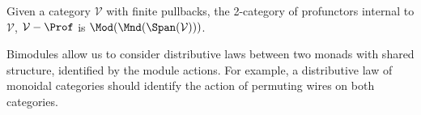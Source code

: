 



\begin{definition}
\label{def:fa}
\end{definition}


\begin{definition}
\label{def:ba}
\end{definition}



\begin{lemma}
\label{lemma:spanpres}
\end{lemma}



\begin{definition}
\label{def:bimod}
\end{definition}



\begin{definition}
\label{def:internalprof}
Given a category $\mathcal V$ with finite pullbacks, the 2-category of profunctors internal to $\mathcal V$, $\mathcal{V}-\Prof$ is $\Mod(\Mnd(\Span(\mathcal{V})))$.
\end{definition}

Bimodules allow us to consider distributive laws between two monads with shared structure, identified by the module actions.  For example, a distributive law of monoidal categories should identify the action of permuting wires on both categories. 



